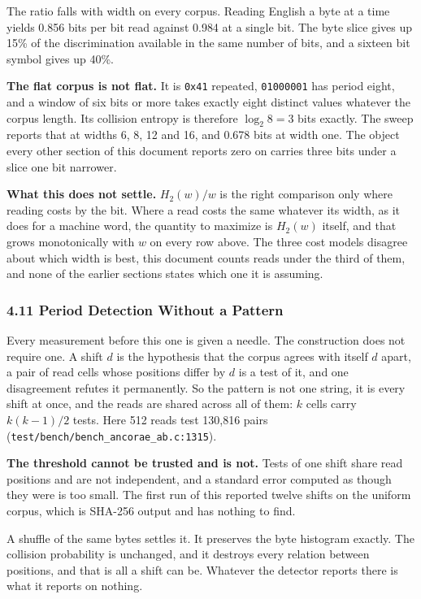 The ratio falls with width on every corpus. Reading English a byte at a time yields 0.856 bits per bit read against 0.984 at a single bit. The byte slice gives up 15\% of the discrimination available in the same number of bits, and a sixteen bit symbol gives up 40\%.

\noindent\textbf{The flat corpus is not flat.} It is \texttt{0x41} repeated, \texttt{01000001} has period eight, and a window of six bits or more takes exactly eight distinct values whatever the corpus length. Its collision entropy is therefore \(\log_2 8 = 3\) bits exactly. The sweep reports that at widths 6, 8, 12 and 16, and 0.678 bits at width one. The object every other section of this document reports zero on carries three bits under a slice one bit narrower.

\noindent\textbf{What this does not settle.} \(H_2(w)/w\) is the right comparison only where reading costs by the bit. Where a read costs the same whatever its width, as it does for a machine word, the quantity to maximize is \(H_2(w)\) itself, and that grows monotonically with \(w\) on every row above. The three cost models disagree about which width is best, this document counts reads under the third of them, and none of the earlier sections states which one it is assuming.

\subsubsection{4.11 Period Detection Without a Pattern}

Every measurement before this one is given a needle. The construction does not require one. A shift \(d\) is the hypothesis that the corpus agrees with itself \(d\) apart, a pair of read cells whose positions differ by \(d\) is a test of it, and one disagreement refutes it permanently. So the pattern is not one string, it is every shift at once, and the reads are shared across all of them: \(k\) cells carry \(k(k-1)/2\) tests. Here 512 reads test 130,816 pairs (\texttt{test/\allowbreak{}bench/\allowbreak{}bench\_\allowbreak{}ancorae\_\allowbreak{}ab.\allowbreak{}c:1315}).

\noindent\textbf{The threshold cannot be trusted and is not.} Tests of one shift share read positions and are not independent, and a standard error computed as though they were is too small. The first run of this reported twelve shifts on the uniform corpus, which is SHA-256 output and has nothing to find.

A shuffle of the same bytes settles it. It preserves the byte histogram exactly. The collision probability is unchanged, and it destroys every relation between positions, and that is all a shift can be. Whatever the detector reports there is what it reports on nothing.

